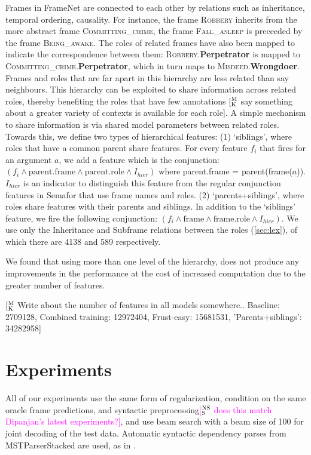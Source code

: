 \documentclass[11pt,a4paper]{article}
\newcommand{\ensuretext}[1]{#1}
\newcommand{\nssmarker}{\ensuretext{\textcolor{magenta}{\ensuremath{^{\textsc{NS}}_{\textsc{S}}}}}}
\newcommand{\mkmarker}{\ensuretext{\textcolor{mdgreen}{\ensuremath{^{\textsc{M}}_{\textsc{K}}}}}}
\newcommand{\arkcomment}[3]{\ensuretext{\textcolor{#3}{[#1 #2]}}}
\newcommand{\nss}[1]{\arkcomment{\nssmarker}{#1}{magenta}}
\newcommand{\mk}[1]{\arkcomment{\mkmarker}{#1}{mdgreen}}
\newcommand{\fnf}[1]{\textsc{\textsf{#1}}} %
\newcommand{\fnr}[1]{\textbf{\textsf{#1}}} %
\begin{document}
Frames in FrameNet are connected to each other by relations such as inheritance, temporal ordering, causality. 
For instance, the frame \fnf{Robbery} inherits from the more abstract frame \fnf{Committing\_crime}, the 
frame \fnf{Fall\_asleep} is preceeded by the frame \fnf{Being\_awake}. The roles of related frames have 
also been mapped to indicate the correspondence between them: \fnf{Robbery}.\fnr{Perpetrator} is mapped to 
\fnf{Committing\_crime}.\fnr{Perpetrator}, which in turn maps to \fnf{Misdeed}.\fnr{Wrongdoer}. Frames and roles that are far
apart in this hierarchy are less related than say neighbours.
This hierarchy can be exploited to share information across related roles, thereby benefiting the roles 
that have few annotations \mk{say something about a greater variety of contexts is available for each role}. 
A simple mechanism to share information is via shared model parameters between related roles. Towards this, we define two types of
hierarchical features: (1) `siblings', where roles that have a common parent share features. For every feature $f_i$ 
that fires for an argument $a$, we add a feature which is the conjunction: 
$(f_i \wedge \textrm{parent.frame} \wedge \textrm{parent.role} \wedge I_{hier})$ where parent.frame = parent(frame($a$)). 
$I_{hier}$ is an indicator to distinguish this feature from the regular conjunction features in Semafor that use frame names and roles.
(2) `parents+siblings', where roles share features with their parents and siblings. In addition to the `siblings' feature, 
we fire the following conjunction: $(f_i \wedge \textrm{frame} \wedge \textrm{frame.role} \wedge I_{hier})$.
We use only the Inheritance and Subframe relations between the roles (\cref{sec:lex}), of which there are 4138 and 589 respectively.

We found that using more than one level of the hierarchy, does not produce any improvements in the performance at the cost of
increased computation due to the greater number of features.

\mk{Write about the number of features in all models somewhere.. 
Baseline: 2709128, Combined training: 12972404, Frust-easy: 15681531, 'Parents+siblings': 34282958}

\section{Experiments}

All of our experiments use the same form of regularization, 
condition on the same oracle frame predictions, 
and syntactic preprocessing\nss{does this match Dipanjan's latest experiments?}, 
and use beam search with a beam size of 100 for joint decoding of the test data.
Automatic syntactic dependency parses from MSTParserStacked \citep{martins-08} are used, as in \cite{das-14}. %
\end{document}
